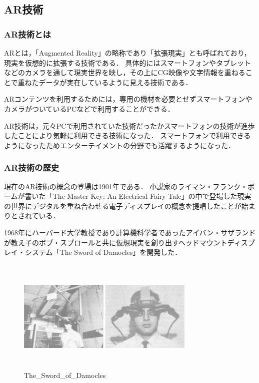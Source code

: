 \documentclass[12pt,a4j]{ltjsarticle}
\begin{document}
\subsection{AR技術}
\subsubsection{AR技術とは}
ARとは，「Augmented Reality」の略称であり「拡張現実」とも呼ばれており，現実を仮想的に拡張する技術である．
具体的にはスマートフォンやタブレットなどのカメラを通して現実世界を映し，その上にCG映像や文字情報を重ねることで重ねたデータが実在しているように見える技術である\cite{ARとは}．

ARコンテンツを利用するためには，専用の機材を必要とせずスマートフォンやカメラがついているPCなどで利用することができる．

AR技術は，元々PCで利用されていた技術だったかスマートフォンの技術が進歩したことにより気軽に利用できる技術になった．
スマートフォンで利用できるようになったためエンターテイメントの分野でも活躍するようになった．

\subsubsection{AR技術の歴史}
現在のAR技術の概念の登場は1901年である．
小説家のライマン・フランク・ボームが書いた「The Master Key: An Electrical Fairy Tale」の中で登場した現実の世界にデジタルを重ね合わせる電子ディスプレイの概念を提唱したことが始まりとされている．

1968年にハーバード大学教授であり計算機科学者であったアイバン・サザランドが教え子のボブ・スプロールと共に仮想現実を創り出すヘッドマウントディスプレイ・システム「The Sword of Damocles」を開発した．

\begin{figure}[h]
\begin{center}
 \includegraphics[clip,width=85mm,height=55mm]{The_Sword_of_Damocles.pdf}
\end{center}
 \caption{The\_Sword\_of\_Damocles}
 \label{fig:The_Sword_of_Damocles.pdf}
\end{figure}
\end{document}
